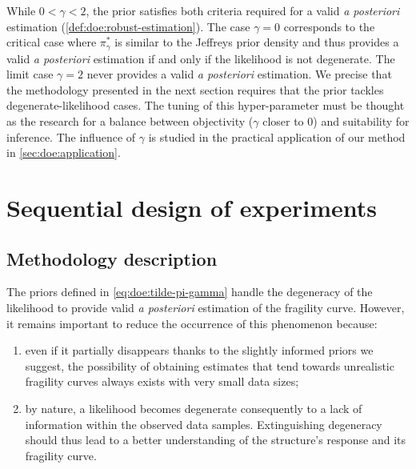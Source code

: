 

While $0<\gamma<2$, the prior satisfies both criteria required for a valid \emph{a posteriori} estimation (\cref{def:doe:robust-estimation}). The case $\gamma=0$ corresponds to the critical case where $\pi^\ast_\gamma$ is similar to the Jeffreys prior density and thus provides a valid \emph{a posteriori} estimation if and only if the likelihood is not degenerate. The limit case $\gamma=2$ never provides a valid \emph{a posteriori} estimation. We precise that the methodology presented in the next section requires that the prior tackles degenerate-likelihood cases. The tuning of this hyper-parameter must be thought as the research for a balance between objectivity ($\gamma$ closer to $0$) and suitability for inference. The influence of $\gamma$ is studied in the practical application of our method in \cref{sec:doe:application}.











\section{Sequential design of experiments%
}\label{sec:doe:PEmethod}

\subsection{Methodology description}



The priors defined in \cref{eq:doe:tilde-pi-gamma} handle the degeneracy of the likelihood to provide valid \emph{a posteriori} estimation of the fragility curve. However, it remains important to reduce the occurrence of this phenomenon because: %
    \begin{enumerate}
        \item[(i)]  even if it partially disappears thanks to the slightly informed priors we suggest, { the possibility of obtaining estimates that tend towards unrealistic fragility curves always exists with very small data sizes;}
        \item[(ii)] by nature, a likelihood becomes degenerate consequently to a lack of information within the observed data samples. Extinguishing degeneracy should thus lead to a better understanding of the structure's response and its fragility curve.
    \end{enumerate}

